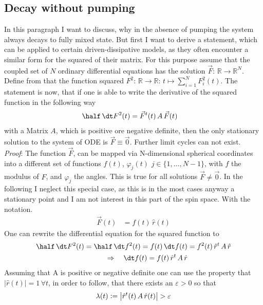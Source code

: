 \begin{appendices}
    \section{Decay without pumping}
    \label{appendix:msq_calc}
    In this paragraph I want to discuss, why in the absence of pumping the system always decays to fully mixed state. But first I want to derive a statement, which can be applied to certain driven-dissipative models, as they often encounter a similar form for the squared of their matrix. For this purpose assume that the coupled set of $N$ ordinary differential equations has the solution $\vec{F}:\,\mathbb{R}\rightarrow\mathbb{R}^N$. Define from that the function squared $F^2:\,\mathbb{R}\rightarrow\mathbb{R}:\,t\mapsto\sum_{i=1}^NF_i^2(t)$. The statement is now, that if one is able to write the derivative of the squared function in the following way
    \begin{align*}
        \half\,\dt F^2(t)&=\vec{F}^t(t)\,A\,\vec{F}(t)
    \end{align*}
    with a Matrix $A$, which is positive ore negative definite, then the only stationary solution to the system of ODE is $\vec{F}\equiv\vec{0}$. Further limit cycles can not exist. \\
    \textit{Proof}: The function $\vec{F}$, can be mapped via N-dimensional spherical coordinates into a different set of functions $f(t)$, $\varphi_j(t)$ $j\in\{1,\dots,N-1\}$, with $f$ the modulus of $F$, and $\varphi_j$ the angles. This is true for all solutions $\vec{F}\neq\vec{0}$. In the following I neglect this special case, as this is in the most cases anyway a stationary point and I am not interest in this part of the spin space. With the notation.
    \begin{align*}
        \vec{F}(t)&=f(t)\,\hat{r}(t)
    \end{align*}
    One can rewrite the differential equation for the squared function to
    \begin{align*}
        \half\,\dt F^2(t)=\half\,\dt f^2(t)=f(t)\,\dt f(t)&=f^2(t)\,\hat{r}^t\,A\,\hat{r}\\
        \Rightarrow\quad\dt f(t) = f(t)\,\hat{r}^t\,A\,\hat{r}
    \end{align*}
    Assuming that A is positive or negative definite one can use the property that $|\hat{r}(t)|=1\,\forall t$, in order to follow, that there exists an $\varepsilon>0$ so that
    \begin{align*}
        \lambda(t)\vcentcolon=\left| \hat{r}^t(t)\,A\,\hat{r}(t) \right| > \varepsilon

\end{align*}
\end{appendices}
